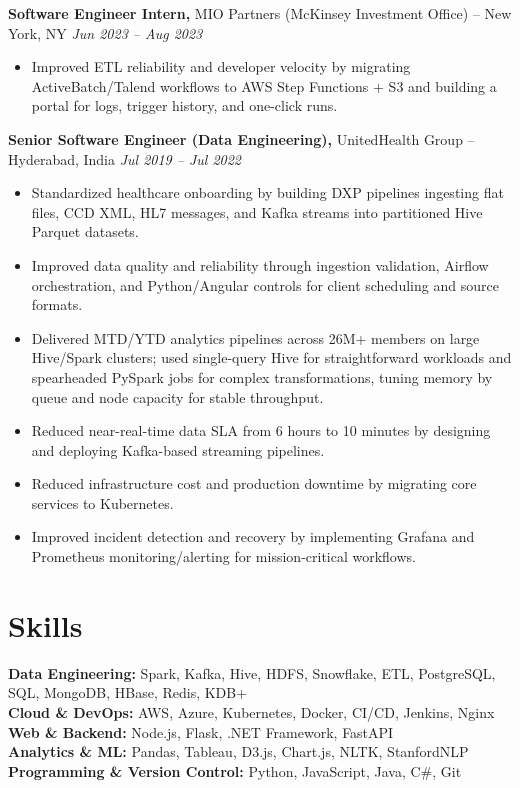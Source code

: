 \documentclass[10pt]{article}
\begin{document}
\textbf{Software Engineer Intern,} MIO Partners (McKinsey Investment Office) -- New York, NY \hfill \textit{Jun 2023 -- Aug 2023} \\
\vspace{0pt}
\begin{itemize}
  \item Improved ETL reliability and developer velocity by migrating ActiveBatch/Talend workflows to AWS Step Functions + S3 and building a portal for logs, trigger history, and one-click runs.
\end{itemize}

\textbf{Senior Software Engineer (Data Engineering),} UnitedHealth Group -- Hyderabad, India \hfill \textit{Jul 2019 -- Jul 2022} \\
\vspace{0pt}
\begin{itemize}
  \item Standardized healthcare onboarding by building DXP pipelines ingesting flat files, CCD XML, HL7 messages, and Kafka streams into partitioned Hive Parquet datasets.
  \item Improved data quality and reliability through ingestion validation, Airflow orchestration, and Python/Angular controls for client scheduling and source formats.
  \item Delivered MTD/YTD analytics pipelines across 26M+ members on large Hive/Spark clusters; used single-query Hive for straightforward workloads and spearheaded PySpark jobs for complex transformations, tuning memory by queue and node capacity for stable throughput.
  \item Reduced near-real-time data SLA from 6 hours to 10 minutes by designing and deploying Kafka-based streaming pipelines.
  \item Reduced infrastructure cost and production downtime by migrating core services to Kubernetes.
  \item Improved incident detection and recovery by implementing Grafana and Prometheus monitoring/alerting for mission-critical workflows.
\end{itemize}

\vspace{0pt}

\section*{Skills}
\textbf{Data Engineering:} Spark, Kafka, Hive, HDFS, Snowflake, ETL, PostgreSQL, SQL, MongoDB, HBase, Redis, KDB+ \\
\textbf{Cloud \& DevOps:} AWS, Azure, Kubernetes, Docker, CI/CD, Jenkins, Nginx \\
\textbf{Web \& Backend:} Node.js, Flask, .NET Framework, FastAPI \\
\textbf{Analytics \& ML:} Pandas, Tableau, D3.js, Chart.js, NLTK, StanfordNLP \\
\textbf{Programming \& Version Control:} Python, JavaScript, Java, C\#, Git
\end{document}
